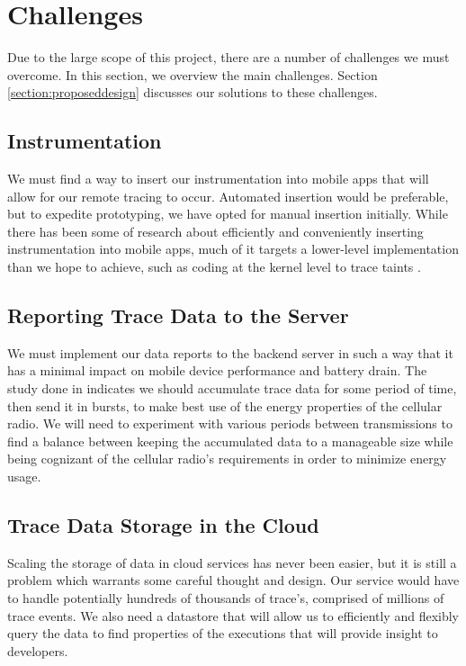 \section{Challenges}
\label{section:challenges}
Due to the large scope of this project, there are a number of challenges we must overcome.
In this section, we overview the main challenges. Section \ref{section:proposeddesign} discusses
our solutions to these challenges.

\subsection{Instrumentation}
We must find a way to insert our instrumentation into mobile apps that will
allow for our remote tracing to occur. Automated insertion would be preferable,
but to expedite prototyping, we have opted for manual insertion initially.
While there has been some of research about efficiently and conveniently inserting
instrumentation into mobile apps, much of it targets a lower-level implementation than
we hope to achieve, such as coding at the kernel level to trace taints \cite{TaintDroid}.

\subsection{Reporting Trace Data to the Server}
We must implement our data reports to the backend server in such a way that it
has a minimal impact on mobile device performance and battery drain. The study done
in \cite{PeriodicTransfers} indicates we should accumulate trace data for some
period of time, then send it in bursts, to make best use of the energy properties
of the cellular radio. We will need to experiment with various
periods between transmissions to find a balance between keeping the accumulated data to a manageable
size while being cognizant of the cellular radio's requirements in order to minimize
energy usage.

\subsection{Trace Data Storage in the Cloud}
Scaling the storage of data in cloud services has never been easier,
but it is still a problem which warrants some careful thought and design.
Our service would have to handle potentially hundreds of thousands of trace's,
comprised of millions of trace events. We also need a datastore that will allow
us to efficiently and flexibly query the data to find properties of the executions that will
provide insight to developers.

